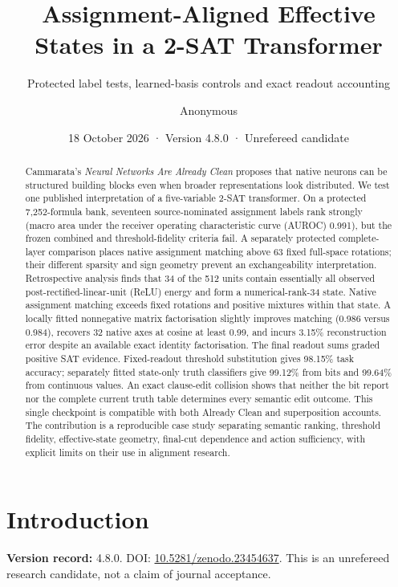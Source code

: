 \documentclass[
  british,
  11pt,
  a4paper,
]{article}
\title{Assignment-Aligned Effective States in a 2-SAT Transformer}
\subtitle{Protected label tests, learned-basis controls and exact
readout accounting}
\author{Anonymous}
\date{18 October 2026 · Version 4.8.0 · Unrefereed candidate}
\begin{document}
\maketitle
\begin{abstract}
Cammarata's \emph{Neural Networks Are Already Clean} proposes that
native neurons can be structured building blocks even when broader
representations look distributed. We test one published interpretation
of a five-variable 2-SAT transformer. On a protected 7,252-formula bank,
seventeen source-nominated assignment labels rank strongly (macro area
under the receiver operating characteristic curve (AUROC) 0.991), but
the frozen combined and threshold-fidelity criteria fail. A separately
protected complete-layer comparison places native assignment matching
above 63 fixed full-space rotations; their different sparsity and sign
geometry prevent an exchangeability interpretation. Retrospective
analysis finds that 34 of the 512 units contain essentially all observed
post-rectified-linear-unit (ReLU) energy and form a numerical-rank-34
state. Native assignment matching exceeds fixed rotations and positive
mixtures within that state. A locally fitted nonnegative matrix
factorisation slightly improves matching (0.986 versus 0.984), recovers
32 native axes at cosine at least 0.99, and incurs 3.15\% reconstruction
error despite an available exact identity factorisation. The final
readout sums graded positive SAT evidence. Fixed-readout threshold
substitution gives 98.15\% task accuracy; separately fitted state-only
truth classifiers give 99.12\% from bits and 99.64\% from continuous
values. An exact clause-edit collision shows that neither the bit report
nor the complete current truth table determines every semantic edit
outcome. This single checkpoint is compatible with both Already Clean
and superposition accounts. The contribution is a reproducible case
study separating semantic ranking, threshold fidelity, effective-state
geometry, final-cut dependence and action sufficiency, with explicit
limits on their use in alignment research.
\end{abstract}

{
\setcounter{tocdepth}{3}
\tableofcontents
}
\section{Introduction}\label{introduction}

\textbf{Version record:} 4.8.0. DOI:
\href{https://doi.org/10.5281/zenodo.23454637}{10.5281/zenodo.23454637}.
This is an unrefereed research candidate, not a claim of journal
acceptance.
\end{document}
